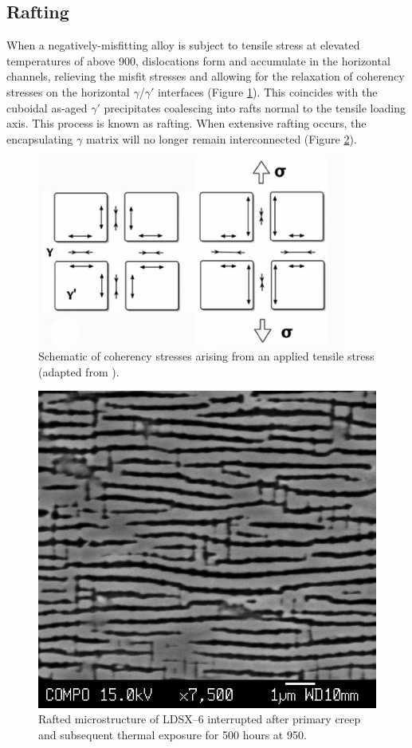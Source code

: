 \subsection{Rafting}\label{Rafting}
When a negatively-misfitting alloy is subject to tensile stress at elevated temperatures of above 900\celsius, dislocations form and accumulate in the horizontal channels, relieving the misfit stresses and allowing for the relaxation of coherency stresses on the horizontal $\gamma$/$\gamma'$ interfaces (Figure \ref{fig:CoherencyStress}).  This coincides with the cuboidal as-aged $\gamma'$ precipitates coalescing into rafts normal to the tensile loading axis.  This process is known as rafting.  When extensive rafting occurs, the encapsulating $\gamma$ matrix will no longer remain interconnected (Figure \ref{fig:LDSX6rafts}). 
%
\begin{figure}[H]
\begin{center}
\includegraphics[width=10cm]{CoherencyStress}
\caption{Schematic of coherency stresses arising from an applied tensile stress (adapted from \cite{reed06}).}
\label{fig:CoherencyStress}
\end{center}
\end{figure}
%
\begin{figure}[H]
\begin{center}
\includegraphics{LDSX6rafts}
\caption{Rafted microstructure of LDSX--6 interrupted after primary creep and subsequent thermal exposure for 500 hours at 950\celsius. }
\label{fig:LDSX6rafts}
\end{center}
\end{figure}
